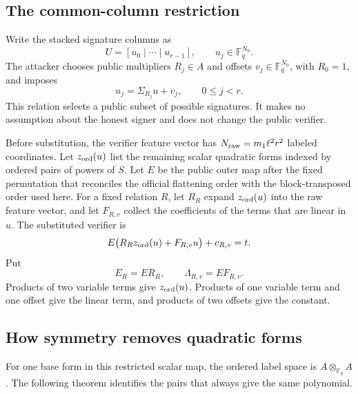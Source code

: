 \documentclass[11pt]{article}
\newcommand{\F}{\mathbb F}
\begin{document}
\subsection{The common-column restriction}
Write the stacked signature columns as
\[
  U=[u_0\mid\cdots\mid u_{r-1}],\qquad u_j\in\F_q^{N_0}.
\]
The attacker chooses public multipliers $R_j\in A$ and offsets
$v_j\in\F_q^{N_0}$, with $R_0=1$, and imposes
\begin{equation}
  u_j=\Sigma_{R_j}u+v_j,
  \qquad 0\le j<r.                                  \label{eq:column-relation}
\end{equation}
This relation selects a public subset of possible signatures.  It makes no
assumption about the honest signer and does not change the public verifier.

Before substitution, the verifier feature vector has
$N_{\rm raw}=m_1\ell^2r^2$ labeled coordinates.  Let $z_{\rm ord}(u)$ list
the remaining scalar quadratic forms indexed by ordered pairs of powers of
$S$.  Let $E$ be the public outer map after the fixed permutation that
reconciles the official flattening order with the block-transposed order used
here.  For a fixed relation $R$, let $R_R$ expand $z_{\rm ord}(u)$ into the
raw feature vector, and let $F_{R,v}$ collect the coefficients of the terms
that are linear in $u$.  The substituted verifier is
\begin{equation}
  E\bigl(R_R z_{\rm ord}(u)+F_{R,v}u\bigr)+c_{R,v}=t.
  \label{eq:substituted-verifier}
\end{equation}
Put
\[
 E_R=ER_R,
 \qquad
 \Lambda_{R,v}=EF_{R,v}.
\]
Products of two variable terms give $z_{\rm ord}(u)$.  Products of one
variable term and one offset give the linear term, and products of two offsets
give the constant.

\subsection{How symmetry removes quadratic forms}
For one base form in this restricted scalar map, the ordered label space is
$A\otimes_{\F_q}A$.  The following theorem identifies the pairs that always
give the same polynomial.
\end{document}
